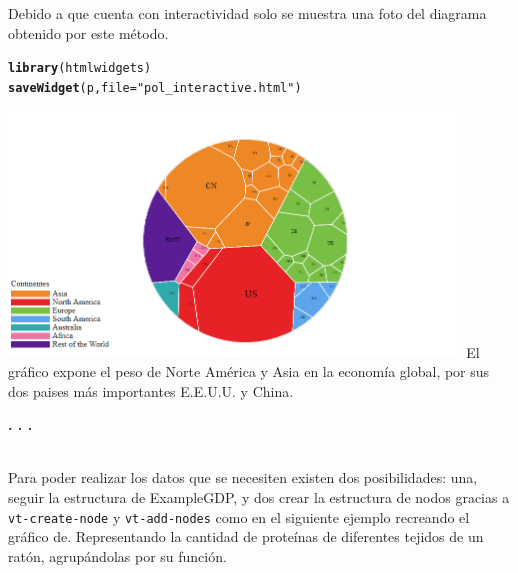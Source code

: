 \documentclass{article}\usepackage[]{graphicx}\usepackage[]{color}
\makeatletter
\newcommand{\hlstr}[1]{\textcolor[rgb]{0.192,0.494,0.8}{#1}}%
\newcommand{\hlstd}[1]{\textcolor[rgb]{0.345,0.345,0.345}{#1}}%
\newcommand{\hlkwc}[1]{\textcolor[rgb]{0.333,0.667,0.333}{#1}}%
\newcommand{\hlkwd}[1]{\textcolor[rgb]{0.737,0.353,0.396}{\textbf{#1}}}%
\newenvironment{kframe}{%
 \def\at@end@of@kframe{}%
 \ifinner\ifhmode%
  \def\at@end@of@kframe{\end{minipage}}%
  \begin{minipage}{\columnwidth}%
 \fi\fi%
 \def\FrameCommand##1{\hskip\@totalleftmargin \hskip-\fboxsep
 \colorbox{shadecolor}{##1}\hskip-\fboxsep
     \hskip-\linewidth \hskip-\@totalleftmargin \hskip\columnwidth}%
 \MakeFramed {\advance\hsize-\width
   \@totalleftmargin\z@ \linewidth\hsize
   \@setminipage}}%
 {\par\unskip\endMakeFramed%
 \at@end@of@kframe}
\newenvironment{knitrout}{}{} %
\makeatother
\begin{document}
Debido a que cuenta con interactividad solo se muestra una foto del diagrama obtenido por este m\'etodo.
\begin{knitrout}
\color{fgcolor}\begin{kframe}
\begin{alltt}
\hlkwd{library}\hlstd{(htmlwidgets)}
\hlkwd{saveWidget}\hlstd{(p,}\hlkwc{file}\hlstd{=}\hlstr{"pol_interactive.html"}\hlstd{)}
\end{alltt}
\end{kframe}
\end{knitrout}
\vbox{
    \centering
    \includegraphics[width=0.9\textwidth]{imag/pol_interactive}
}
El gr\'afico expone el peso de Norte Am\'erica y Asia en la econom\'ia global, por sus dos paises m\'as importantes E.E.U.U. y China. 
\begin{center}
\textbf{. . .}
\end{center}
~\\
Para poder realizar los datos que se necesiten existen dos posibilidades: una, seguir la estructura de ExampleGDP, y dos crear la estructura de nodos gracias a \texttt{vt-create-node} y \texttt{vt-add-nodes} como en el siguiente ejemplo recreando el gr\'afico de\cite[p\'ag 194]{Circle}. Representando la cantidad de prote\'inas de diferentes tejidos de un rat\'on, agrup\'andolas por su funci\'on.
\end{document}
